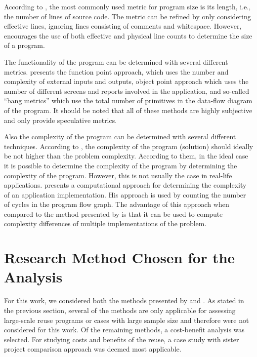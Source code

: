 According to \citet{fenton_software_1998}, the most commonly used metric for program size is its length, i.e., the number of lines of source code. The metric can be refined by only considering effective lines, ignoring lines consisting of comments and whitespace. However, \citet{fenton_software_1998} encourages the use of both effective and physical line counts to determine the size of a program.

The functionality of the program can be determined with several different metrics. \citet{fenton_software_1998} presents the function point approach, which uses the number and complexity of external inputs and outputs, object point approach which uses the number of different screens and reports involved in the application, and so-called ``bang metrics'' which use the total number of primitives in the data-flow diagram of the program. It should be noted that all of these methods are highly subjective and only provide speculative metrics.

Also the complexity of the program can be determined with several different techniques. According to \citet{fenton_software_1998}, the complexity of the program (solution) should ideally be not higher than the problem complexity. According to them, in the ideal case it is possible to determine the complexity of the program by determining the complexity of the program. However, this is not usually the case in real-life applications. \citet{mccabe_complexity_1976} presents a computational approach for determining the complexity of an application implementation. His approach is used by counting the number of cycles in the program flow graph. The advantage of this approach when compared to the method presented by \citet{fenton_software_1998} is that it can be used to compute complexity differences of multiple implementations of the problem.


\section{Research Method Chosen for the Analysis}

For this work, we considered both the methods presented by \citet{frakes_software_1996} and \citet{mohagheghi_quality_2007}. As stated in the previous section, several of the methods are only applicable for assessing large-scale reuse programs or cases with large sample size and therefore were not considered for this work. Of the remaining methods, a cost-benefit analysis was selected. For studying costs and benefits of the reuse, a case study with sister project comparison approach was deemed most applicable. 

